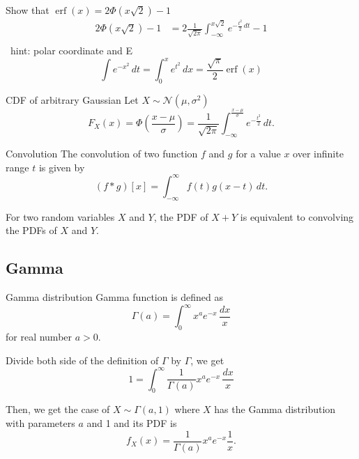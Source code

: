 \documentclass[11pt,a4paper,fleqn]{article}
\numberwithin{equation}{section}
\DeclareMathOperator\Erf{\ensuremath{\text{erf}}}
\newcommand{\TODO}{\textcolor{ErrorRed}{\fbox{TODO}}\ }
\begin{document}
\begin{exec}
    Show that $\Erf(x)=2\Phi(x\sqrt{2})-1$
    \tcblower
    \TODO
    \begin{align*}
        2\Phi(x\sqrt{2})-1
        &= 2\frac{1}{\sqrt{2\pi}}\int_{-\infty}^{x\sqrt{2}}e^{-\frac{t^2}{2}\,dt}-1\\
    \end{align*}
    \TODO hint: polar coordinate and E
    \begin{equation*}
        \int e^{-x^2}\,dt = \int_{0}^{x} e^{t^2}\,dx = \frac{\sqrt{\pi}}{2}\Erf(x)
    \end{equation*}
\end{exec}

\begin{fact}{CDF of arbitrary Gaussian}{}
    Let $X\sim \mathcal{N}(\mu, \sigma^2)$
    \begin{equation*}
        F_X(x)=\Phi(\frac{x-\mu}{\sigma}) = \frac{1}{\sqrt{2\pi}}\int_{-\infty}^{\frac{x-\mu}{\sigma}} e^{-\frac{t^2}{2}}\,dt.
    \end{equation*}
\end{fact}

\begin{fact}{Convolution}{}
    The convolution of two function $f$ and $g$ for a value $x$ over infinite range $t$ is given by
    \begin{equation*}
        (f*g)[x] = \int_{-\infty}^{\infty}f(t)g(x-t)\,dt.
    \end{equation*}
\end{fact}

For two random variables $X$ and $Y$, the PDF of $X+Y$ is equivalent to convolving the PDFs of $X$ and $Y$.

\subsection{Gamma}

\begin{fact}{Gamma distribution}{}
Gamma function is defined as
\begin{equation*}
    \Gamma(a)=\int_{0}^{\infty} x^a e^{-x}\,\frac{dx}{x}
\end{equation*}
for real number $a>0$.

Divide both side of the definition of $\Gamma$ by $\Gamma$, we get
\begin{equation*}
    1=\int_{0}^{\infty} \frac{1}{\Gamma(a)}x^a e^{-x}\,\frac{dx}{x}
\end{equation*}

Then, we get the case of $X \sim \Gamma(a,1)$ where $X$ has the Gamma distribution with parameters $a$ and 1 and its PDF is
\begin{equation}
    f_X(x)=\frac{1}{\Gamma(a)}x^a e^{-x}\frac{1}{x}.
\end{equation}
    
\end{fact}
\end{document}
